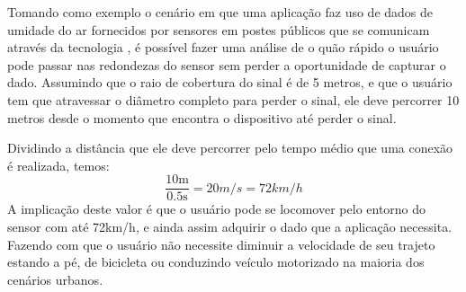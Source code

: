 Tomando como exemplo o cenário em que uma aplicação faz uso de dados de umidade do ar fornecidos por sensores em postes públicos que se comunicam através da tecnologia \ble, é possível fazer uma análise de o quão rápido o usuário pode passar nas redondezas do sensor sem perder a oportunidade de capturar o dado.
Assumindo que o raio de cobertura do sinal \bluetooth é de 5 metros, e que o usuário tem que atravessar o diâmetro completo para perder o sinal, ele deve percorrer 10 metros desde o momento que encontra o dispositivo até perder o sinal.

Dividindo a distância que ele deve percorrer pelo tempo médio que uma conexão é realizada, temos:
\[
	\frac{10\si{\meter}}{0.5\si{\second}} = 20\si{m/s} = 72\si{km/h}
\]
A implicação deste valor é que o usuário pode se locomover pelo entorno do sensor com até 72\si{km/h}, e ainda assim adquirir o dado que a aplicação necessita. Fazendo com que o usuário não necessite diminuir a velocidade de seu trajeto estando a pé, de bicicleta ou conduzindo veículo motorizado na maioria dos cenários urbanos.


